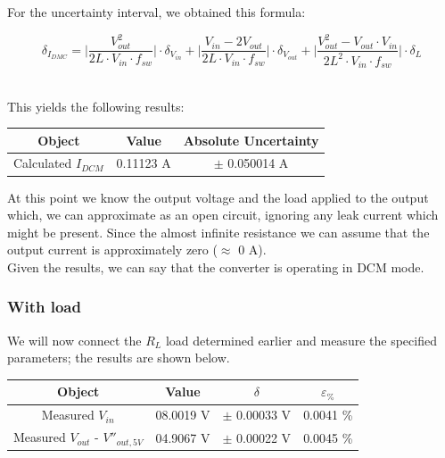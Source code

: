 \documentclass[../main.tex]{subfiles}
\begin{document}
For the uncertainty interval, we obtained this formula:

\[ \delta_{I_{DMC}} = \bigg| \frac{V_{out}^2}{2L\cdot V_{in} \cdot f_{sw}}\bigg| \cdot \delta_{V_{in}} + \bigg|  \frac{V_{in} - 2 V_{out}}{2L\cdot V_{in} \cdot f_{sw}}   \bigg| \cdot  \delta_{V_{out}} + \bigg| \frac{V_{out}^2 - V_{out} \cdot V_{in}}{2L^2\cdot V_{in} \cdot f_{sw}} \bigg| \cdot \delta_{L }\]\



This yields the following results:


\begin{center}
\begin{tabular}{c c c}
\textbf{Object} & \textbf{Value} & \textbf{Absolute Uncertainty} \\

\hline
Calculated $I_{DCM}$ & 0.11123 A & $\pm$ 0.050014 A \\ 

\end{tabular}
\end{center}


At this point we know the output voltage and the load applied to the output which, we can approximate as an open circuit, ignoring any leak current which might be present. Since the almost infinite resistance we can assume that the output current is approximately zero ($\approx$ 0 A).\\

Given the results, we can say that the converter is operating in DCM mode.


\subsubsection*{With load}

We will now connect the $R_L$ load determined earlier and measure the specified parameters; the results are shown below.

\begin{center}
\begin{tabular}{c c c c}
\textbf{Object} & \textbf{Value} & $\delta$ & $\varepsilon_{\%}$  \\

\hline
Measured $V_{in}$ &  08.0019 V & $\pm$  0.00033 V & 0.0041 \% \\ 
\hline
Measured $V_{out}$ - $V''_{out,5V}$  &  04.9067 V  & $\pm$ 0.00022 V & 0.0045 \%  \\ 
\end{tabular}
\end{center}
\end{document}
